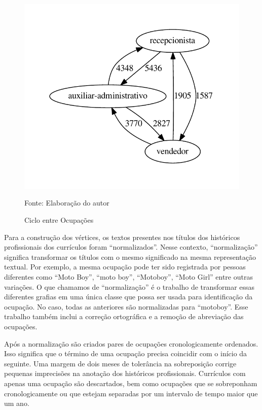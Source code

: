 \documentclass[12pt,a4paper]{article}
\newcommand{\source}[1]{\vspace{-10pt} \caption*{Fonte: {#1}} }
\begin{document}
\begin{figure}[ht]
  \centering
  \includegraphics[scale=0.8]{ciclo-operacional.pdf}
  \caption{Ciclo entre Ocupações}
  \source{Elaboração do autor}
  \label{fig:grafo-ciclo-operacional}
\end{figure}

Para a construção dos vértices, os textos presentes nos títulos dos históricos profissionais dos currículos foram \enquote{normalizados}. Nesse contexto, \enquote{normalização} significa transformar os títulos com o mesmo significado na mesma representação textual. Por exemplo, a mesma ocupação pode ter sido registrada por pessoas diferentes como \enquote{Moto Boy}, \enquote{moto boy}, \enquote{Motoboy}, \enquote{Moto Girl} entre outras variações. O que chamamos de \enquote{normalização} é o trabalho de transformar essas diferentes grafias em uma única classe que possa ser usada para identificação da ocupação. No caso, todas as anteriores são normalizadas para \enquote{motoboy}. Esse trabalho também inclui a correção ortográfica e a remoção de abreviação das ocupações.

Após a normalização são criados pares de ocupações cronologicamente ordenados. Isso significa que o término de uma ocupação precisa coincidir com o início da seguinte. Uma margem de dois meses de tolerância na sobreposição corrige pequenas imprecisões na anotação dos históricos profissionais. Currículos com apenas uma ocupação são descartados, bem como ocupações que se sobreponham cronologicamente ou que estejam separadas por um intervalo de tempo maior que um ano.
\end{document}

